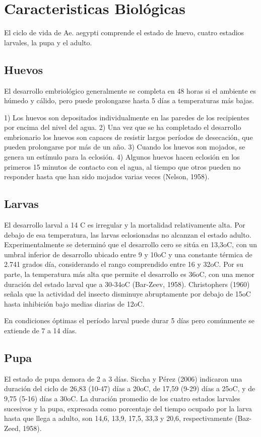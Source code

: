 \section{Caracteristicas Biológicas}
\label{sec:caracteristicas-biologicas}

El ciclo de vida de Ae. aegypti comprende el estado de huevo, cuatro
estadios larvales, la pupa y el adulto.

\subsection{Huevos}
El desarrollo embriológico generalmente se completa en 48 horas
si el ambiente es húmedo y cálido, pero puede prolongarse hasta
5 días a temperaturas más bajas.

1) Los huevos son depositados individualmente en las paredes de los
recipientes por encima del nivel del agua.
2) Una vez que se ha completado el desarrollo embrionario los
huevos son capaces de resistir largos períodos de desecación,
que pueden prolongarse por más de un año.
3) Cuando los huevos son mojados, se genera un estímulo para la eclosión.
4) Algunos huevos hacen eclosión en los primeros 15 minutos de
contacto con el agua, al tiempo que otros pueden no responder hasta
que han sido mojados varias veces (Nelson, 1958).


\subsection{Larvas}
El desarrollo larval a 14 C es irregular y la mortalidad relativamente
alta. Por debajo de esa temperatura, las larvas eclosionadas no alcanzan
el estado adulto. Experimentalmente se determinó que el desarrollo cero
se sitúa en 13,3oC, con un umbral inferior de desarrollo ubicado entre
9 y 10oC y una constante térmica de 2.741 grados día, considerando el
rango comprendido entre 16 y 32oC. Por su parte, la temperatura más alta
que permite el desarrollo es 36oC, con una menor duración del estado
larval que a 30-34oC (Bar-Zeev, 1958). Christophers (1960) señala que la
actividad del insecto disminuye abruptamente por debajo de 15oC hasta
inhibición bajo medias diarias de 12oC.

En condiciones óptimas el período larval puede durar 5 días pero
comúnmente se extiende de 7 a 14 días.

\subsection{Pupa}
El estado de pupa demora de 2 a 3 días. Siccha y Pérez (2006) indicaron
una duración del ciclo de 26,83
(10-47) días a 20oC, de 17,59 (9-29) días a 25oC, y de 9,75 (5-16) días
a 30oC. La duración promedio de los cuatro estados larvales sucesivos
y la pupa, expresada como porcentaje del tiempo ocupado por la larva
hasta que llega a adulto, son 14,6, 13,9, 17,5, 33,3 y 20,6, respectivamente
(Baz-Zeed, 1958).

